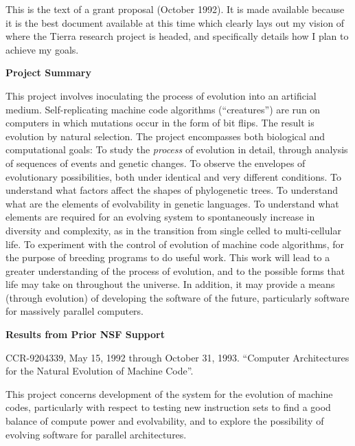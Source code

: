 \vspace{1cm}

This is the text of a grant proposal (October 1992).  It is made available
because it is the best document available at this time which clearly
lays out my vision of where the Tierra research project is headed,
and specifically details how I plan to achieve my goals.

\newpage

\begin{center}
\large \bf Project Summary\rm \normalsize\vspace{12pt}\\
\end{center}

This project involves inoculating the process of evolution into an artificial
medium.  Self-replicating machine code algorithms (``creatures'') are run on
computers in which mutations occur in the form of bit flips.  The result is
evolution by natural selection.  The project encompasses both biological and
computational goals: To study the {\it process} of evolution in detail,
through analysis of sequences of events and genetic changes.  To observe the
envelopes of evolutionary possibilities, both under identical and very
different conditions.  To understand what factors affect the shapes of
phylogenetic trees.  To understand what are the elements of evolvability in
genetic languages.  To understand what elements are required for an evolving
system to spontaneously increase in diversity and complexity, as in the
transition from single celled to multi-cellular life.  To experiment with the
control of evolution of machine code algorithms, for the purpose of breeding
programs to do useful work.  This work will lead to a greater understanding of
the process of evolution, and to the possible forms that life may take on
throughout the universe.  In addition, it may provide a means (through
evolution) of developing the software of the future, particularly software for
massively parallel computers.

\newpage

\begin{center}
\large \bf Results from Prior NSF Support\rm \normalsize\\
\end{center}

CCR-9204339, May 15, 1992 through October 31, 1993.  ``Computer
Architectures for the Natural Evolution of Machine Code''.

This project concerns development of the system for the evolution of
machine codes, particularly with respect to testing new instruction sets
to find a good balance of compute power and evolvability, and to explore
the possibility of evolving software for parallel architectures.

